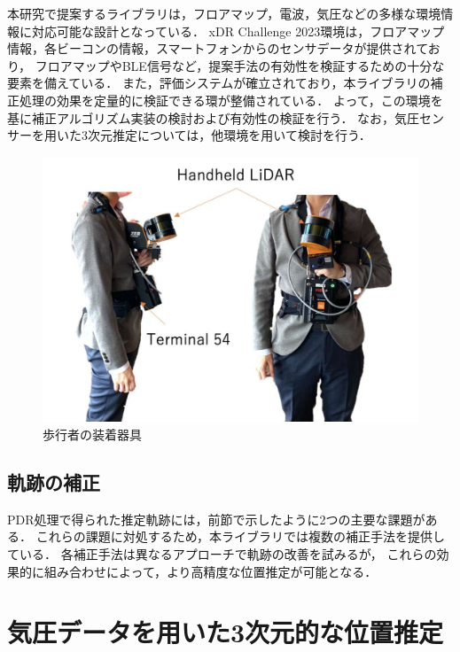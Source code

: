 本研究で提案するライブラリは，フロアマップ，電波，気圧などの多様な環境情報に対応可能な設計となっている．
xDR Challenge 2023環境は，フロアマップ情報，各ビーコンの情報，スマートフォンからのセンサデータが提供されており，
フロアマップやBLE信号など，提案手法の有効性を検証するための十分な要素を備えている．
また，評価システムが確立されており，本ライブラリの補正処理の効果を定量的に検証できる環が整備されている．
よって，この環境を基に補正アルゴリズム実装の検討および有効性の検証を行う．
なお，気圧センサーを用いた3次元推定については，他環境を用いて検討を行う．

\begin{figure}[ht]
	\centering
	\includegraphics[width=\linewidth]{../image/lidar.pdf}
	\caption{歩行者の装着器具}    \label{fig:device}
\end{figure}






\subsection{軌跡の補正}

PDR処理で得られた推定軌跡には，前節で示したように2つの主要な課題がある．
これらの課題に対処するため，本ライブラリでは複数の補正手法を提供している．
各補正手法は異なるアプローチで軌跡の改善を試みるが，
これらの効果的に組み合わせによって，より高精度な位置推定が可能となる．








\section{気圧データを用いた3次元的な位置推定}



